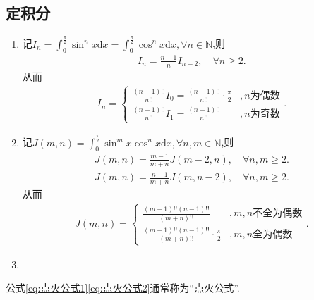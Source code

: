 \documentclass[../../main.tex]{subfiles}
\begin{document}
\subsection{定积分}

\begin{enumerate}
\item 记$I_n=\int_0^{\frac{\pi}{2}}\sin^n x\mathrm{d}x=\int_0^{\frac{\pi}{2}}\cos^n x\mathrm{d}x,\forall n\in \mathbb{N}$,则
\begin{align*}
I_n=\frac{n-1}{n}I_{n-2},\quad \forall n\geqslant 2.
\end{align*}
从而
\begin{align}\label{eq:点火公式1}
I_n=
\begin{cases}
\frac{(n-1)!!}{n!!}I_0=\frac{(n-1)!!}{n!!}\cdot \frac{\pi}{2}&,n\text{为偶数}\\
\frac{(n-1)!!}{n!!}I_1=\frac{(n-1)!!}{n!!}&,n\text{为奇数}
\end{cases}.
\end{align}

\item 记$J(m,n)=\int_0^{\frac{\pi}{2}}\sin^m x\cos^n x\mathrm{d}x,\forall n,m\in \mathbb{N}$,则
\begin{align*}
J(m,n)=\frac{m-1}{m+n}J(m-2,n),\quad \forall n,m\geqslant 2.
\end{align*}
\begin{align*}
J(m,n)=\frac{n-1}{m+n}J(m,n-2),\quad \forall n,m\geqslant 2.
\end{align*}
从而
\begin{align}\label{eq:点火公式2}
J(m,n)=
\begin{cases}
\frac{(m-1)!!(n-1)!!}{(m+n)!!}&,m,n\text{不全为偶数}\\
\frac{(m-1)!!(n-1)!!}{(m+n)!!}\cdot \frac{\pi}{2}&,m,n\text{全为偶数}
\end{cases}.
\end{align}

\item 
\end{enumerate}
\begin{remark}
公式\eqref{eq:点火公式1}\eqref{eq:点火公式2}通常称为“点火公式”.
\end{remark}
\end{document}
